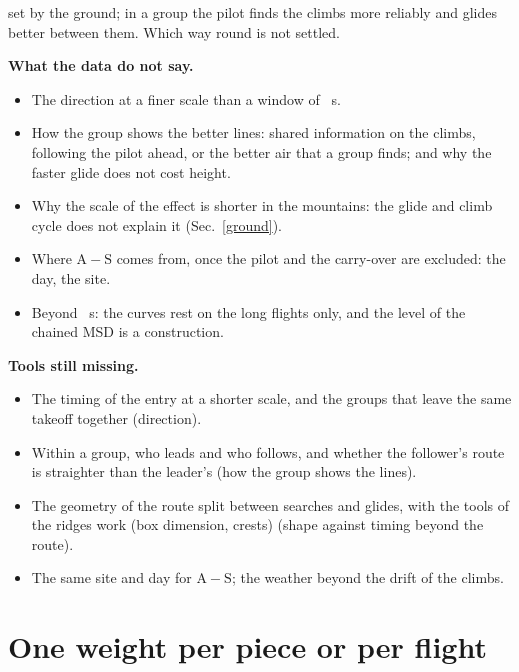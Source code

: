 \documentclass[10pt,a4paper]{article}
\newcommand{\A}{\mathrm{A}}
\newcommand{\Sl}{\mathrm{S}}
\newcommand{\Com}{\item[\textcolor{black}{\textbf{Comment.}}]\color{black}}
\newenvironment{step}{\begin{description}[leftmargin=0pt, itemsep=7pt, topsep=8pt]}{\end{description}}
\begin{document}
\begin{step}
{  set by the ground; in a group the pilot finds the climbs more reliably and glides better between them. Which way
  round is not settled.}
\Com \textbf{What the data do not say.}
  \begin{itemize}
  \item The direction at a finer scale than a window of \WhenWindow~s.
  \item How the group shows the better lines: shared information on the climbs, following the pilot ahead, or the
    better air that a group finds; and why the faster glide does not cost height.
  \item Why the scale of the effect is shorter in the mountains: the glide and climb cycle does not explain it
    (Sec.~\ref{ground}).
  \item Where $\A-\Sl$ comes from, once the pilot and the carry-over are excluded: the day, the site.
  \item Beyond \ChainSolidEnd~s: the curves rest on the long flights only, and the level of the chained MSD is a
    construction.
  \end{itemize}
\Com \textbf{Tools still missing.}
  \begin{itemize}
  \item The timing of the entry at a shorter scale, and the groups that leave the same takeoff together (direction).
  \item Within a group, who leads and who follows, and whether the follower's route is straighter than the
    leader's (how the group shows the lines).
  \item The geometry of the route split between searches and glides, with the tools of the ridges work (box
    dimension, crests) (shape against timing beyond the route).
  \item The same site and day for $\A-\Sl$; the weather beyond the drift of the climbs.
  \end{itemize}
\end{step}

\appendix
\section{One weight per piece or per flight}\label{app:weights}
\end{document}
